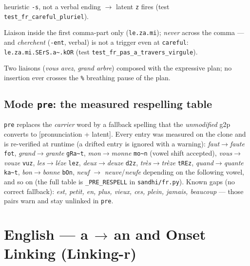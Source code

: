 \documentclass[11pt,a4paper]{report}
\newcommand{\smp}[1]{\texttt{#1}}          %
\newcommand{\tld}{\textasciitilde{}}      %
\begin{document}
\begin{description}[style=nextline]
        heuristic \smp{-s}, not a verbal ending $\rightarrow$ latent
        \smp{z} fires (test \smp{test\_fr\_careful\_pluriel}).
  \item[``les amis, cherchent encore''.] Liaison inside the first
        comma-part only (\smp{le.za.mi}); \emph{never} across the comma —
        and \emph{cherchent} (\smp{-ent}, verbal) is not a trigger even at
        \smp{careful}: \smp{le.za.mi.SErS.a\tld.kOR} (test
        \smp{test\_fr\_pas\_a\_travers\_virgule}).
  \item[``vous avez un tr\`es grand arbre'' + \smp{-{}-expressive}.]
        Two liaisons (\emph{vous avez}, \emph{grand arbre}) composed with
        the expressive plan; no insertion ever crosses the \smp{\%}
        breathing pause of the plan.
\end{description}

\section{Mode \smp{pre}: the measured respelling table}

\smp{pre} replaces the \emph{carrier} word by a fallback spelling that the
\emph{unmodified} g2p converts to [pronunciation + latent]. Every entry was
measured on the clone and is re-verified at runtime (a drifted entry is
ignored with a warning): \emph{faut}$\rightarrow$\emph{faute} \smp{fot},
\emph{grand}$\rightarrow$\emph{grante} \smp{gRa\tld{}t},
\emph{mon}$\rightarrow$\emph{monne} \smp{mo\tld{}n} (vowel shift accepted),
\emph{vous}$\rightarrow$\emph{vouze} \smp{vuz},
\emph{les}$\rightarrow$\emph{l\'eze} \smp{lez},
\emph{deux}$\rightarrow$\emph{deuze} \smp{d2z},
\emph{tr\`es}$\rightarrow$\emph{tr\`eze} \smp{tREz},
\emph{quand}$\rightarrow$\emph{quante} \smp{ka\tld{}t},
\emph{bon}$\rightarrow$\emph{bonne} \smp{bOn},
\emph{neuf} $\rightarrow$ \emph{neuve}/\emph{neufe} depending on the
following vowel, and so on (the full table is \smp{\_PRE\_RESPELL} in
\smp{sandhi/fr.py}). Known gaps (no correct fallback): \emph{est, petit,
en, plus, vieux, ces, plein, jamais, beaucoup} — those pairs warn and stay
unlinked in \smp{pre}.

\chapter{English — a\,$\rightarrow$\,an and Onset Linking (Linking-r)}
\label{chap:en}
\end{document}
